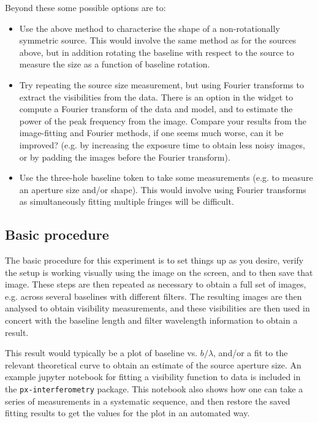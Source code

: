 \documentclass[11pt]{article}
\begin{document}
Beyond these some possible options are to:
\begin{itemize}
    \item Use the above method to characterise the shape of a non-rotationally symmetric source. This would involve the same method as for the sources above, but in addition rotating the baseline with respect to the source to measure the size as a function of baseline rotation.
    \item Try repeating the source size measurement, but using Fourier transforms to extract the visibilities from the data. There is an option in the widget to compute a Fourier transform of the data and model, and to estimate the power of the peak frequency from the image. Compare your results from the image-fitting and Fourier methods, if one seems much worse, can it be improved? (e.g. by increasing the exposure time to obtain less noisy images, or by padding the images before the Fourier transform).
    \item Use the three-hole baseline token to take some measurements (e.g. to measure an aperture size and/or shape). This would involve using Fourier transforms as simultaneously fitting multiple fringes will be difficult.
\end{itemize}

\subsection{Basic procedure}

The basic procedure for this experiment is to set things up as you desire, verify the setup is working visually using the image on the screen, and to then save that image. These steps are then repeated as necessary to obtain a full set of images, e.g. across several baselines with different filters. The resulting images are then analysed to obtain visibility measurements, and these visibilities are then used in concert with the baseline length and filter wavelength information to obtain a result.

This result would typically be a plot of baseline vs. $b/\lambda$, and/or a fit to the relevant theoretical curve to obtain an estimate of the source aperture size. An example jupyter notebook for fitting a visibility function to data is included in the \texttt{px-interferometry} package. This notebook also shows how one can take a series of measurements in a systematic sequence, and then restore the saved fitting results to get the values for the plot in an automated way.
\end{document}
